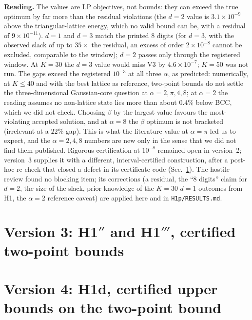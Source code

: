 \documentclass[11pt,a4paper]{article}
\begin{document}
\textbf{Reading.} The values are LP objectives, not bounds: they can exceed the true optimum by far more than the residual
violations (the $d=2$ value is $3.1\times10^{-9}$ above the triangular-lattice energy, which no valid bound can be, with a residual
of $9\times10^{-11}$). $d=1$ and $d=3$ match the printed 8 digits (for $d=3$, with the observed slack of up to $35\times$ the residual, an excess
of order $2\times10^{-8}$ cannot be excluded, comparable to the window); $d=2$ passes only through the registered window. At $K=30$ the
$d=3$ value would miss V3 by $4.6\times10^{-7}$; $K=50$ was not run. The gaps exceed the registered $10^{-3}$ at all three $\alpha$, as predicted: numerically,
at $K\le40$ and with the best lattice as reference, two-point bounds do not settle the three-dimensional Gaussian-core question at
$\alpha=2,\pi,4,8$; at $\alpha=2$ the reading assumes no non-lattice state lies more than about $0.4\%$ below BCC, which we did not check.
Choosing $\beta$ by the largest value favours the most-violating accepted solution, and at $\alpha=8$ the $\beta$ optimum is not
bracketed (irrelevant at a $22\%$ gap). This is what the literature value at $\alpha=\pi$ led us to expect, and the $\alpha=2,4,8$ numbers are new only
in the sense that we did not find them published. Rigorous certification at $10^{-8}$ remained open in version~2; version~3 supplies it with a different, interval-certified construction, after a post-hoc re-check that closed a defect in its certificate code (Sec.~\ref{sec:h1pp}). The hostile review found no
blocking item; its corrections (a residual, the ``8 digits'' claim for $d=2$, the size of the slack, prior knowledge of the $K=30$
$d=1$ outcomes from H1, the $\alpha=2$ reference caveat) are applied here and in \texttt{H1p/RESULTS.md}.

\section{Version 3: H1$''$ and H1$'''$, certified two-point bounds}\label{sec:h1pp}


\section{Version 4: H1d, certified upper bounds on the two-point bound}\label{sec:h1d}

\end{document}
